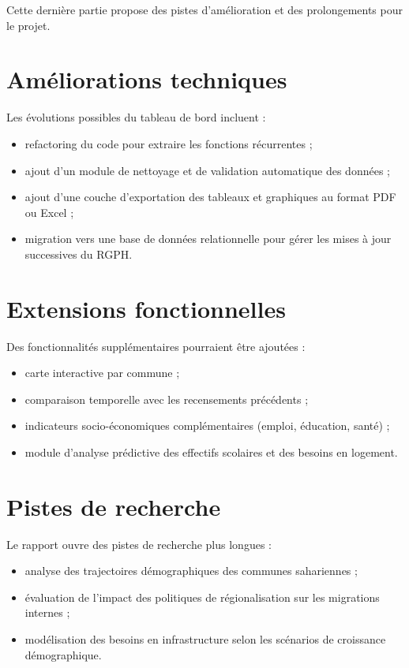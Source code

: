 \documentclass[12pt,a4paper,oneside]{report}
\begin{document}
Cette dernière partie propose des pistes d'amélioration et des prolongements pour le projet.

\section{Améliorations techniques}

Les évolutions possibles du tableau de bord incluent :

\begin{itemize}[leftmargin=*]
  \item refactoring du code pour extraire les fonctions récurrentes ;
  \item ajout d'un module de nettoyage et de validation automatique des données ;
  \item ajout d'une couche d'exportation des tableaux et graphiques au format PDF ou Excel ;
  \item migration vers une base de données relationnelle pour gérer les mises à jour successives du RGPH.
\end{itemize}

\section{Extensions fonctionnelles}

Des fonctionnalités supplémentaires pourraient être ajoutées :

\begin{itemize}[leftmargin=*]
  \item carte interactive par commune ;
  \item comparaison temporelle avec les recensements précédents ;
  \item indicateurs socio-économiques complémentaires (emploi, éducation, santé) ;
  \item module d'analyse prédictive des effectifs scolaires et des besoins en logement.
\end{itemize}

\section{Pistes de recherche}

Le rapport ouvre des pistes de recherche plus longues :

\begin{itemize}[leftmargin=*]
  \item analyse des trajectoires démographiques des communes sahariennes ;
  \item évaluation de l'impact des politiques de régionalisation sur les migrations internes ;
  \item modélisation des besoins en infrastructure selon les scénarios de croissance démographique.
\end{itemize}
\end{document}

